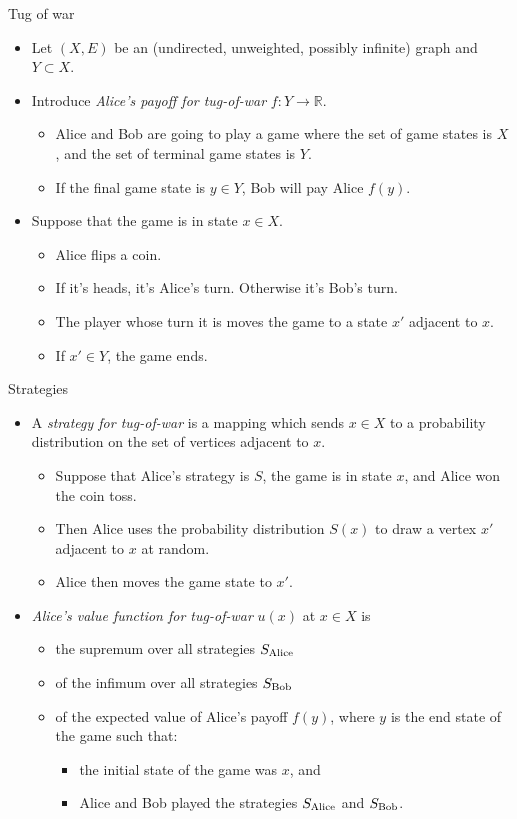 \documentclass[10pt]{beamer}
\newcommand{\RR}{\mathbb{R}}
\begin{document}
\begin{frame}{Tug of war}
\begin{itemize}
\item Let $(X, E)$ be an (undirected, unweighted, possibly infinite) graph and $Y \subset X$. 
\item Introduce \emph{Alice's payoff for tug-of-war} $f: Y \to \RR$.  
\begin{itemize}
\item Alice and Bob are going to play a game where the set of game states is $X$, and the set of terminal game states is $Y$.
\item If the final game state is $y \in Y$, Bob will pay Alice $f(y)$.  
\end{itemize}
\item Suppose that the game is in state $x \in X$.  
\begin{itemize}
\item Alice flips a coin.
\item If it's heads, it's Alice's turn. Otherwise it's Bob's turn.
\item The player whose turn it is moves the game to a state $x'$ adjacent to $x$.
\item If $x' \in Y$, the game ends.
\end{itemize}
\end{itemize}
\end{frame}

\begin{frame}{Strategies}
\begin{itemize}
\item A \emph{strategy for tug-of-war} is a mapping which sends $x \in X$ to a probability distribution on the set of vertices adjacent to $x$. 
\begin{itemize} 
\item Suppose that Alice's strategy is $S$, the game is in state $x$, and Alice won the coin toss. 
\item Then Alice uses the probability distribution $S(x)$ to draw a vertex $x'$ adjacent to $x$ at random.
\item Alice then moves the game state to $x'$. 
\end{itemize}
\item \emph{Alice's value function for tug-of-war} $u(x)$ at $x \in X$ is
\begin{itemize}
\item the supremum over all strategies $S_{\rm Alice}$
\item of the infimum over all strategies $S_{\rm Bob}$
\item of the expected value of Alice's payoff $f(y)$, where $y$ is the end state of the game such that:
\begin{itemize}
\item the initial state of the game was $x$, and
\item Alice and Bob played the strategies $S_{\rm Alice}$ and $S_{\rm Bob}$.
\end{itemize}
\end{itemize}
\end{itemize}
\end{frame}
\end{document}
